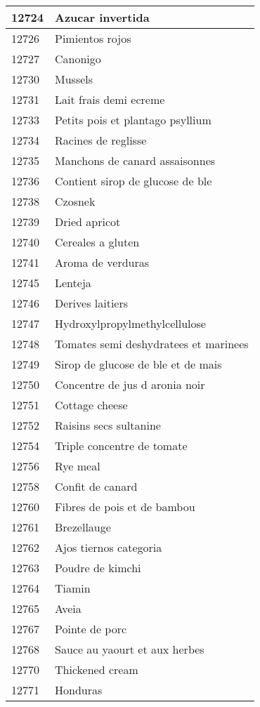 \begin{longtable}{|l|l|}
12724 & Azucar invertida \\ \hline 
12726 & Pimientos rojos \\ \hline 
12727 & Canonigo \\ \hline 
12730 & Mussels \\ \hline 
12731 & Lait frais demi ecreme \\ \hline 
12733 & Petits pois et plantago psyllium \\ \hline 
12734 & Racines de reglisse \\ \hline 
12735 & Manchons de canard assaisonnes \\ \hline 
12736 & Contient sirop de glucose de ble \\ \hline 
12738 & Czosnek \\ \hline 
12739 & Dried apricot \\ \hline 
12740 & Cereales a gluten \\ \hline 
12741 & Aroma de verduras \\ \hline 
12745 & Lenteja \\ \hline 
12746 & Derives laitiers \\ \hline 
12747 & Hydroxylpropylmethylcellulose \\ \hline 
12748 & Tomates semi deshydratees et marinees \\ \hline 
12749 & Sirop de glucose de ble et de mais \\ \hline 
12750 & Concentre de jus d aronia noir \\ \hline 
12751 & Cottage cheese \\ \hline 
12752 & Raisins secs sultanine \\ \hline 
12754 & Triple concentre de tomate \\ \hline 
12756 & Rye meal \\ \hline 
12758 & Confit de canard \\ \hline 
12760 & Fibres de pois et de bambou \\ \hline 
12761 & Brezellauge \\ \hline 
12762 & Ajos tiernos categoria \\ \hline 
12763 & Poudre de kimchi \\ \hline 
12764 & Tiamin \\ \hline 
12765 & Aveia \\ \hline 
12767 & Pointe de porc \\ \hline 
12768 & Sauce au yaourt et aux herbes \\ \hline 
12770 & Thickened cream \\ \hline 
12771 & Honduras \\ \hline 

\end{longtable}
